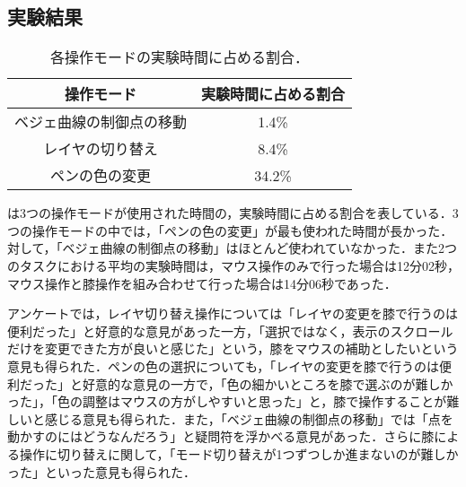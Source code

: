 \documentclass[submit, techrep]{ipsj}
\begin{document}
\subsection{実験結果}
\begin{table}[h]
	\caption{各操作モードの実験時間に占める割合．}
	\label{tb:mode_time}
	\begin{center}
		\begin{tabular}{c|c}
			操作モード    & 実験時間に占める割合 \\ \hline
			ベジェ曲線の制御点の移動 & 1.4\%      \\ 
			レイヤの切り替え & 8.4\%      \\
			ペンの色の変更 & 34.2\%     \\ 
		\end{tabular}
	\end{center}

\end{table}
は3つの操作モードが使用された時間の，実験時間に占める割合を表している．3つの操作モードの中では，「ペンの色の変更」が最も使われた時間が長かった．対して，「ベジェ曲線の制御点の移動」はほとんど使われていなかった．また2つのタスクにおける平均の実験時間は，マウス操作のみで行った場合は12分02秒，マウス操作と膝操作を組み合わせて行った場合は14分06秒であった．\par
アンケートでは，レイヤ切り替え操作については「レイヤの変更を膝で行うのは便利だった」と好意的な意見があった一方，「選択ではなく，表示のスクロールだけを変更できた方が良いと感じた」という，膝をマウスの補助としたいという意見も得られた．ペンの色の選択についても，「レイヤの変更を膝で行うのは便利だった」と好意的な意見の一方で，「色の細かいところを膝で選ぶのが難しかった」，「色の調整はマウスの方がしやすいと思った」と，膝で操作することが難しいと感じる意見も得られた．また，「ベジェ曲線の制御点の移動」では「点を動かすのにはどうなんだろう」と疑問符を浮かべる意見があった．さらに膝による操作に切り替えに関して，「モード切り替えが1つずつしか進まないのが難しかった」といった意見も得られた．
\end{document}
